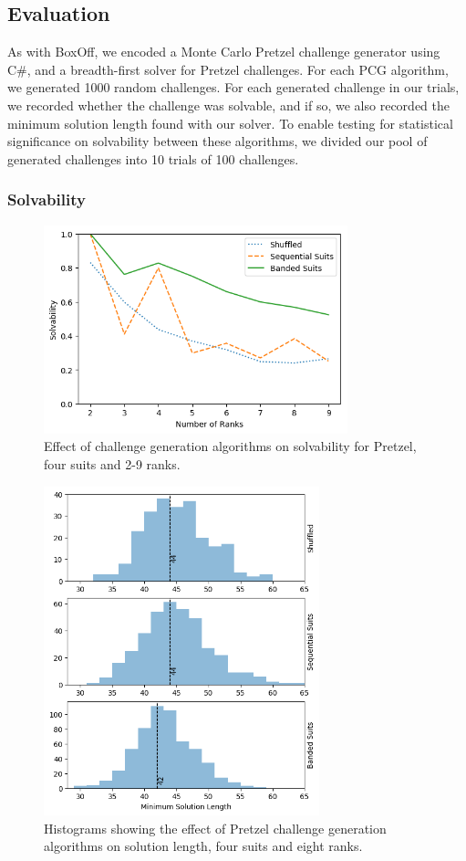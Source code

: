 \documentclass[journal]{IEEEtran}
\begin{document}
\subsection{Evaluation}
\noindent
As with BoxOff, we encoded a Monte Carlo Pretzel challenge generator using C\#, and a breadth-first solver for Pretzel challenges. For each PCG algorithm, we generated 1000 random challenges. For each generated challenge in our trials, we recorded whether the challenge was solvable, and if so, we also recorded the minimum solution length found with our solver. To enable testing for statistical significance on solvability between these algorithms, we divided our pool of generated challenges into 10 trials of 100 challenges. 

\subsubsection{Solvability}

\begin{figure}[t]
\includegraphics[width=8.8cm]{figure9.png}
\caption{Effect of challenge generation algorithms on solvability for Pretzel, four suits and 2-9 ranks.}
\label{fig:pretzelfullsolve}
\end{figure}

\begin{figure}[t]
\centering
\includegraphics[width=8cm]{figure10.png}
\caption{Histograms showing the effect of Pretzel challenge generation algorithms on solution length, four suits and eight ranks.}
\label{fig:pretzellength}
\end{figure}
\end{document}
